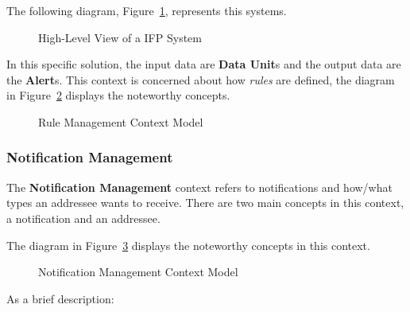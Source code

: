The following diagram, Figure~\ref{fig:design:domain:bounded_contexts:rule:ifp}, represents this systems.

\begin{figure}[H]
   \centering
  \resizebox{\columnwidth}{!}
  {
     
  }
  \caption[High-Level View of a \gls{IFP} System]{High-Level View of a \gls{IFP} System}
  \label{fig:design:domain:bounded_contexts:rule:ifp}
\end{figure}

In this specific solution, the input data are \textbf{Data Unit}s and the output data are the \textbf{Alert}s. This context is concerned about how \textit{rules} are defined, the diagram in Figure~\ref{fig:design:domain:bounded_contexts:rule:diagram} displays the noteworthy concepts.

\begin{figure}[H]
   \centering
  \resizebox{\columnwidth}{!}
  {
     
  }
  \caption[Rule Management Context Model]{Rule Management Context Model}
  \label{fig:design:domain:bounded_contexts:rule:diagram}
\end{figure}

\subsubsection{Notification Management}
\label{subsubsec:design:domain:bounded_contexts:notification}

The \textbf{Notification Management} context refers to notifications and how/what types an addressee wants to receive. There are two main concepts in this context, a notification and an addressee.

The diagram in Figure~\ref{fig:design:domain:bounded_contexts:notification:diagram} displays the noteworthy concepts in this context.

\begin{figure}[H]
   \centering
  \resizebox{\columnwidth}{!}
  {
     
  }
  \caption[Notification Management Context Model]{Notification Management Context Model}
  \label{fig:design:domain:bounded_contexts:notification:diagram}
\end{figure}
 
As a brief description:

